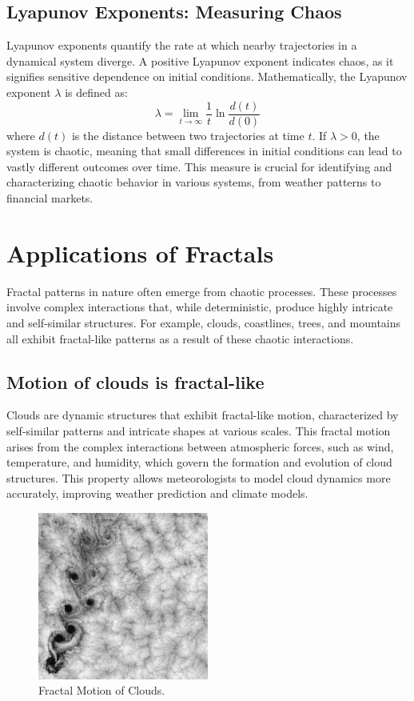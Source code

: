 \documentclass[12pt]{article}
\begin{document}
\newpage

\subsection{Lyapunov Exponents: Measuring Chaos}
Lyapunov exponents quantify the rate at which nearby trajectories in a dynamical system diverge. A positive Lyapunov exponent indicates chaos, as it signifies sensitive dependence on initial conditions. Mathematically, the Lyapunov exponent \( \lambda \) is defined as:
\[
\lambda = \lim_{t \to \infty} \frac{1}{t} \ln \frac{d(t)}{d(0)}
\]
where \( d(t) \) is the distance between two trajectories at time \( t \). If \( \lambda > 0 \), the system is chaotic, meaning that small differences in initial conditions can lead to vastly different outcomes over time. This measure is crucial for identifying and characterizing chaotic behavior in various systems, from weather patterns to financial markets.

\section{Applications of Fractals}
Fractal patterns in nature often emerge from chaotic processes. These processes involve complex interactions that, while deterministic, produce highly intricate and self-similar structures. For example, clouds, coastlines, trees, and mountains all exhibit fractal-like patterns as a result of these chaotic interactions.

\newpage

\subsection{Motion of clouds is fractal-like}
Clouds are dynamic structures that exhibit fractal-like motion, characterized by self-similar patterns and intricate shapes at various scales. This fractal motion arises from the complex interactions between atmospheric forces, such as wind, temperature, and humidity, which govern the formation and evolution of cloud structures. This property allows meteorologists to model cloud dynamics more accurately, improving weather prediction and climate models.

\begin{figure}[H]
\centering
\includegraphics[width=0.5\textwidth]{assets/fractal-clouds.jpg}
\caption{Fractal Motion of Clouds.}
\label{fig:fractal-clouds}
\end{figure}
\end{document}
